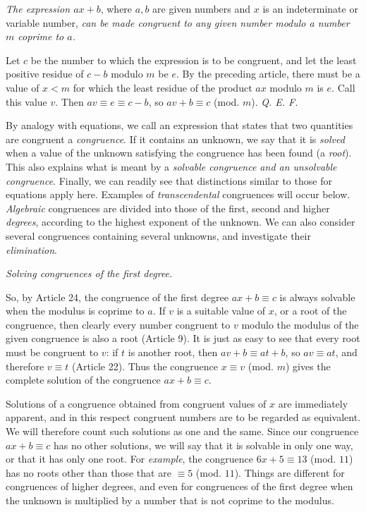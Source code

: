 
\emph{The expression $ax+b$}, where $a, b$ are given numbers and $x$ is an indeterminate or variable number, \emph{can be made congruent to any given number modulo a number $m$ coprime to $a$.}

Let $c$ be the number to which the expression is to be congruent, and let the least positive residue of $c-b$ modulo $m$ be $e$. By the preceding article, there must be a value of $x < m$ for which the least residue of the product $ax$ modulo $m$ is $e$. Call this value $v$. Then $av \equiv e \equiv c-b$, so $av+b \equiv c$ (mod. $m$). \emph{Q. E. F.}


By analogy with equations, we call an expression that states that two quantities are congruent a \emph{congruence}. If it contains an unknown, we say that it is \emph{solved} when a value of the unknown satisfying the congruence has been found (a \emph{root}). This also explains what is meant by a \emph{solvable congruence and an unsolvable congruence}. Finally, we can readily see that distinctions similar to those for equations apply here. Examples of \emph{transcendental} congruences will occur below. \emph{Algebraic} congruences are divided into those of the first, second and higher \emph{degrees}, according to the highest exponent of the unknown. We can also consider several congruences containing several unknowns, and investigate their \emph{elimination}.

\begin{center}
\emph{Solving congruences of the first degree.}
\end{center}


So, by Article 24, the congruence of the first degree $ax+b \equiv c$ is always solvable when the modulus is coprime to $a$. If $v$ is a suitable value of $x$, or a root of the congruence, then clearly every number congruent to $v$ modulo the modulus of the given congruence is also a root (Article 9). It is just as easy to see that every root must be congruent to $v$: if $t$ is another root, then $av+b \equiv at+b$, so $av \equiv at$, and therefore $v \equiv t$ (Article 22). Thus the congruence $x \equiv v$ (mod. $m$) gives the complete solution of the congruence $ax+b \equiv c$.

Solutions of a congruence obtained from congruent values of $x$ are immediately apparent, and in this respect congruent numbers are to be regarded as equivalent. We will therefore count such solutions as one and the same. Since
our congruence $ax+b \equiv c$ has no other solutions, we will say that it is solvable in only one way, or that it has only one root. For \emph{example}, the congruence $6x+5 \equiv 13$ (mod. $11$) has no roots other than those that are $\equiv 5$ (mod. $11$). Things are different for congruences of higher degrees, and even for congruences of the first degree when the unknown is multiplied by a number that is not coprime to the modulus.

